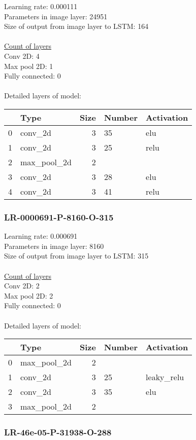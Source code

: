 Learning rate: 0.000111
\\Parameters in image layer: 24951
\\Size of output from image layer to LSTM: 164
\\\\\underline{Count of layers} 
\\Conv 2D:           4\\Max pool 2D:      1\\Fully connected:  0
\\\\Detailed layers of model: \\\begin{tabular}{rlrll}
\hline
    & Type        &   Size & Number   & Activation   \\
\hline
  0 & conv\_2d     &      3 & 35       & elu          \\
  1 & conv\_2d     &      3 & 25       & relu         \\
  2 & max\_pool\_2d &      2 &          &              \\
  3 & conv\_2d     &      3 & 28       & elu          \\
  4 & conv\_2d     &      3 & 41       & relu         \\
\hline
\end{tabular}\subsubsection*{LR-0000691-P-8160-O-315}
Learning rate: 0.000691
\\Parameters in image layer: 8160
\\Size of output from image layer to LSTM: 315
\\\\\underline{Count of layers} 
\\Conv 2D:           2\\Max pool 2D:      2\\Fully connected:  0
\\\\Detailed layers of model: \\\begin{tabular}{rlrll}
\hline
    & Type        &   Size & Number   & Activation   \\
\hline
  0 & max\_pool\_2d &      2 &          &              \\
  1 & conv\_2d     &      3 & 25       & leaky\_relu   \\
  2 & conv\_2d     &      3 & 35       & elu          \\
  3 & max\_pool\_2d &      2 &          &              \\
\hline
\end{tabular}\subsubsection*{LR-46e-05-P-31938-O-288}
